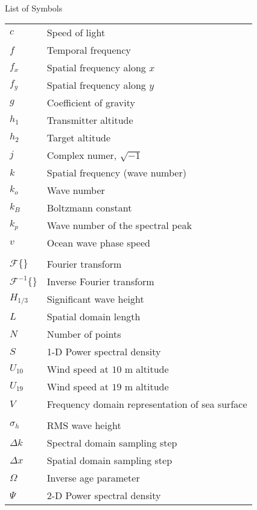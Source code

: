 \renewcommand{\baselinestretch}{1}
\small\normalsize
\hbox{\ }

\begin{center}
\large{List of Symbols}
\end{center} 

\vspace{3pt}

\begin{supertabular}{ll}
$c$ & Speed of light \\
$f$ & Temporal frequency \\
$f_x$ & Spatial frequency along $x$ \\
$f_y$ & Spatial frequency along $y$ \\
$g$ & Coefficient of gravity \\
$h_1$ & Transmitter altitude\\
$h_2$ & Target altitude \\
$j$ & Complex numer, $\sqrt{-1}$ \\
$k$ & Spatial frequency (wave number) \\
$k_o$ & Wave number \\
$k_B$ & Boltzmann constant \\
$k_p$ & Wave number of the spectral peak \\
$v$ & Ocean wave phase speed \\
\\
$\mathcal{F}\{\}$ & Fourier transform \\
$\mathcal{F}^{-1}\{\}$ & Inverse Fourier transform \\
$H_{1/3}$ & Significant wave height \\
$L$ & Spatial domain length \\
$N$ & Number of points \\
$S$ & 1-D Power spectral density \\
$U_{10}$ & Wind speed at $10$ m altitude \\
$U_{19}$ & Wind speed at $19$ m altitude \\
$V$ & Frequency domain representation of sea surface\\
\\
$\sigma_h$ & RMS wave height \\
$\Delta k$ & Spectral domain sampling step \\
$\Delta x$ & Spatial domain sampling step \\
$\Omega$ & Inverse age parameter \\
$\Psi $ & 2-D Power spectral density \\
\end{supertabular}